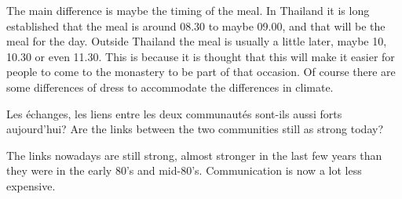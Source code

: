 \answer{}
The main difference is maybe the timing of the meal. In Thailand it
is long established that the meal is around 08.30 to maybe 09.00, and
that will be the meal for the day. Outside Thailand the meal is usually
a little later, maybe 10, 10.30 or even 11.30. This is because it is
thought that this will make it easier for people to come to the
monastery to be part of that occasion. Of course there are some
differences of dress to accommodate the differences in climate.

\questionBi%
{Les échanges, les liens entre les deux communautés sont-ils aussi forts aujourd'hui?}%
{Are the links between the two communities still as strong today?}

\answer{}
The links nowadays are still strong, almost stronger in the last few
years than they were in the early 80's and mid-80's. Communication is
now a lot less expensive.

